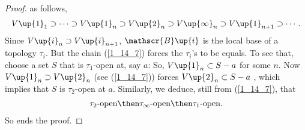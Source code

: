 \begin{proof}
as follows,
%
  \begin{align}\label{1_14_7}
    V\up{1}_1 
      \supset
    \cdots 
      \supset 
    V\up{1}_n
      \supset 
    V\up{2}_n 
      \supset 
    V\up{\infty}_n 
      \supset 
    V\up{1}_{n+1} 
      \supset 
    \cdots .
  \end{align}
%
Since 
  $V\up{i}_n\supset V\up{i}_{n+1}$, 
$\mathscr{B}\up{i}$ is the local base of a topology $\tau_i$. 
But the chain (\ref{1_14_7}) forces the $\tau_i$'s to be equals. 
To see that, choose a set $S$ that is $\tau_1$-open at, say $a$: So, 
%
  $V\up{1}_n \subset S-a$  
%
for some $n$. Now $V\up{1}_n \supset V\up{2}_n$ (see (\ref{1_14_7})) forces  
%
  $V\up{2}_n \subset S-a$ , 
%
which implies that $S$ is $\tau_2$-open at $a$.
Similarly, we deduce, still from (\ref{1_14_7}), that 
\begin{align}
  \tau_2\text{-open} 
    \then 
  \tau_\infty\text{-open} 
    \then 
  \tau_1\text{-open}.
\end{align}
So ends the proof.
\end{proof}





